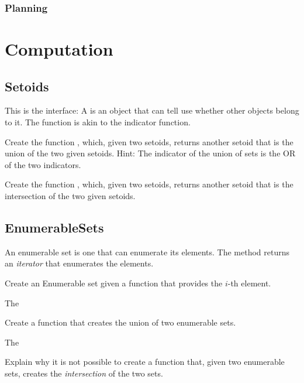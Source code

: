 \subsection{Planning}



\chapter{Computation}


\section{Setoids}

This is the \Setoid interface:
%
%
A \Setoid is an object that can tell use whether other objects belong to it.
The  function is akin to the indicator function.


\begin{gradedexercise}
  Create the function , which, given two setoids, returns another setoid that is the union of the two given setoids.
%
%
  Hint: The indicator of the union of sets is the OR of the two indicators.
\end{gradedexercise}

\begin{gradedexercise}
  Create the function , which, given two setoids, returns another setoid that is the intersection of the two given setoids.
%
\end{gradedexercise}


\section{EnumerableSets}

%
An enumerable set is one that can enumerate its elements.
The method  returns an \emph{iterator} that enumerates the elements.

\begin{gradedexercise}
  Create an Enumerable set given a function that provides the $i$-th element.

  The
%
\end{gradedexercise}

\begin{gradedexercise}
  Create a function that creates the union of two enumerable sets.

  The
%
\end{gradedexercise}

\begin{gradedexercise}
  Explain why it is not possible to create a function that, given two enumerable sets,
  creates the \emph{intersection} of the two sets.
\end{gradedexercise}


